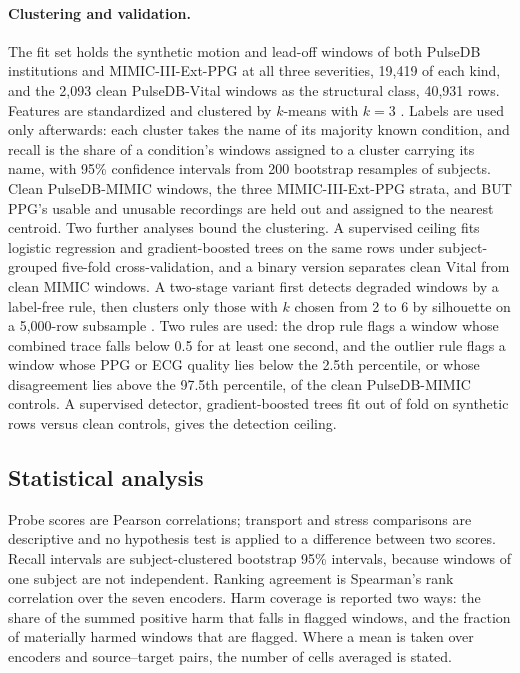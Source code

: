 \documentclass[pmlr,twocolumn,10pt]{jmlr}
\begin{document}
\paragraph{Clustering and validation.}
The fit set holds the synthetic motion and lead-off windows of both PulseDB institutions and MIMIC-III-Ext-PPG at all three severities, 19,419 of each kind, and the 2,093 clean PulseDB-Vital windows as the structural class, 40,931 rows. Features are standardized and clustered by $k$-means with $k=3$ \citep{pedregosa2011sklearn}. Labels are used only afterwards: each cluster takes the name of its majority known condition, and recall is the share of a condition's windows assigned to a cluster carrying its name, with 95\% confidence intervals from 200 bootstrap resamples of subjects. Clean PulseDB-MIMIC windows, the three MIMIC-III-Ext-PPG strata, and BUT PPG's usable and unusable recordings are held out and assigned to the nearest centroid. Two further analyses bound the clustering. A supervised ceiling fits logistic regression and gradient-boosted trees on the same rows under subject-grouped five-fold cross-validation, and a binary version separates clean Vital from clean MIMIC windows. A two-stage variant first detects degraded windows by a label-free rule, then clusters only those with $k$ chosen from 2 to 6 by silhouette on a 5,000-row subsample \citep{rousseeuw1987silhouette}. Two rules are used: the drop rule flags a window whose combined trace falls below 0.5 for at least one second, and the outlier rule flags a window whose PPG or ECG quality lies below the 2.5th percentile, or whose disagreement lies above the 97.5th percentile, of the clean PulseDB-MIMIC controls. A supervised detector, gradient-boosted trees fit out of fold on synthetic rows versus clean controls, gives the detection ceiling.

\subsection{Statistical analysis}
\label{sec:stats}

Probe scores are Pearson correlations; transport and stress comparisons are descriptive and no hypothesis test is applied to a difference between two scores. Recall intervals are subject-clustered bootstrap 95\% intervals, because windows of one subject are not independent. Ranking agreement is Spearman's rank correlation over the seven encoders. Harm coverage is reported two ways: the share of the summed positive harm that falls in flagged windows, and the fraction of materially harmed windows that are flagged. Where a mean is taken over encoders and source--target pairs, the number of cells averaged is stated.
\end{document}
